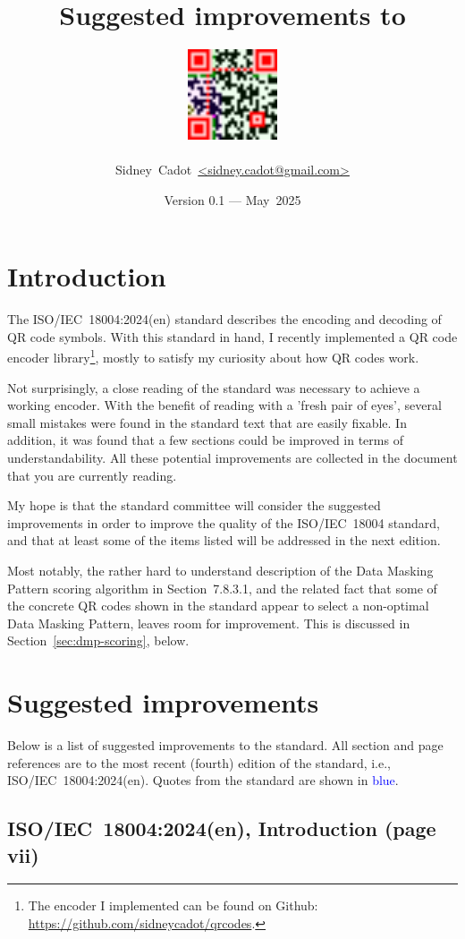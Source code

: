 \documentclass[a4paper,twoside]{article}
\title{Suggested improvements to \standard}
\author{\includegraphics[width=0.2\textwidth]{images/email.png} \\ \\ Sidney~Cadot~\url{<sidney.cadot@gmail.com>}}
\date{Version 0.1 --- May~2025}
\newcommand{\shortstandard}{ISO/IEC~18004}
\newcommand{\standard}{\shortstandard:2024(en)}
\begin{document}
%
%
\maketitle
%
%
\section{Introduction}

The \standard{} standard describes the encoding and decoding of QR code symbols. With this standard in hand,
I recently implemented a QR code encoder library\footnote{The encoder I implemented can be found on Github:
\url{https://github.com/sidneycadot/qrcodes}.}, mostly to satisfy my curiosity about how QR codes work.

Not surprisingly, a close reading of the standard was necessary to achieve a working encoder. With the benefit
of reading with a 'fresh pair of eyes', several small mistakes were found in the standard text that are easily
fixable. In addition, it was found that a few sections could be improved in terms of understandability. All
these potential improvements are collected in the document that you are currently reading.

My hope is that the standard committee will consider the suggested improvements in order to improve the
quality of the \shortstandard{} standard, and that at least some of the items listed will be addressed in
the next edition.

Most notably, the rather hard to understand description of the Data Masking Pattern scoring algorithm in
Section~7.8.3.1, and the related fact that some of the concrete QR codes shown in the standard appear to
select a non-optimal Data Masking Pattern, leaves room for improvement. This is discussed in
Section~\ref{sec:dmp-scoring}, below.

\section{Suggested improvements}

Below is a list of suggested improvements to the standard. All section and page references are to the most recent (fourth)
edition of the standard, i.e., \standard. Quotes from the standard are shown in \textcolor{blue}{blue}.

\subsection{\standard, Introduction (page vii)}
\end{document}
